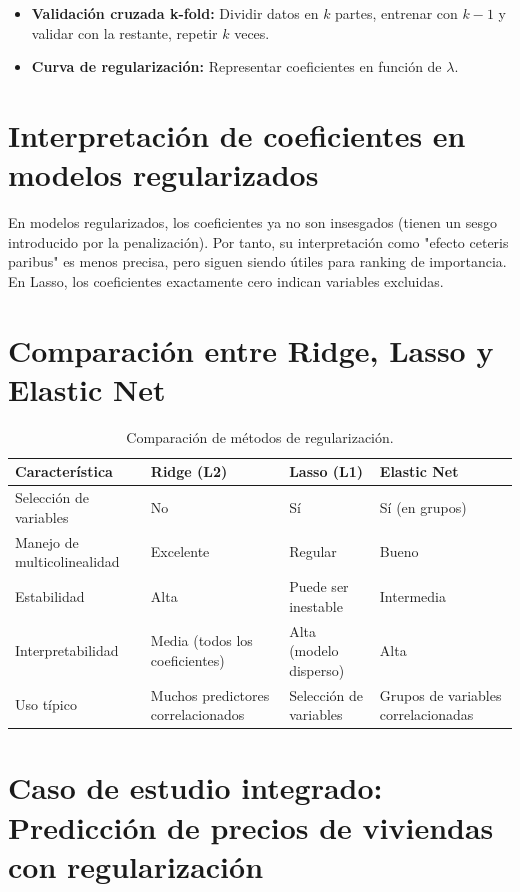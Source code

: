 \documentclass[12pt,a4paper,openany,oneside]{book}
\begin{document}
\begin{itemize}
    \item \textbf{Validación cruzada k-fold:} Dividir datos en \(k\) partes, entrenar con \(k-1\) y validar con la restante, repetir \(k\) veces.
    \item \textbf{Curva de regularización:} Representar coeficientes en función de \(\lambda\).
\end{itemize}

\section{Interpretación de coeficientes en modelos regularizados}
En modelos regularizados, los coeficientes ya no son insesgados (tienen un sesgo introducido por la penalización). Por tanto, su interpretación como "efecto ceteris paribus" es menos precisa, pero siguen siendo útiles para ranking de importancia. En Lasso, los coeficientes exactamente cero indican variables excluidas.

\section{Comparación entre Ridge, Lasso y Elastic Net}

\begin{table}[h]
\centering
\begin{tabular}{|l|l|l|l|}
\hline
\textbf{Característica} & \textbf{Ridge (L2)} & \textbf{Lasso (L1)} & \textbf{Elastic Net} \\
\hline
Selección de variables & No & Sí & Sí (en grupos) \\
Manejo de multicolinealidad & Excelente & Regular & Bueno \\
Estabilidad & Alta & Puede ser inestable & Intermedia \\
Interpretabilidad & Media (todos los coeficientes) & Alta (modelo disperso) & Alta \\
Uso típico & Muchos predictores correlacionados & Selección de variables & Grupos de variables correlacionadas \\
\hline
\end{tabular}
\caption{Comparación de métodos de regularización.}
\end{table}

\section{Caso de estudio integrado: Predicción de precios de viviendas con regularización}
\end{document}
